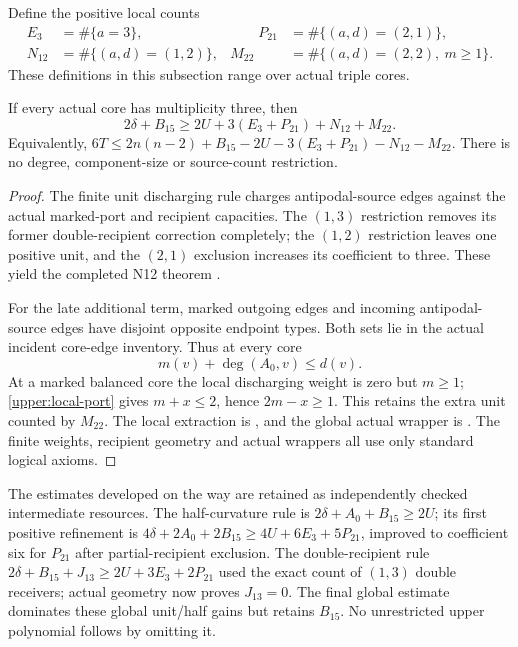 Define the positive local counts
\[
 \begin{aligned}
 E_3&=\#\{a=3\},&\qquad P_{21}&=\#\{(a,d)=(2,1)\},\\
 N_{12}&=\#\{(a,d)=(1,2)\},& M_{22}&=\#\{(a,d)=(2,2),\ m\ge1\}.
 \end{aligned}
\]
These definitions in this subsection range over actual triple cores.
\begin{theorem}
\label{upper:final-m22}
If every actual core has multiplicity three, then
\begin{equation}
 2\delta+B_{15}\ge2U+3(E_3+P_{21})+N_{12}+M_{22}.
 \label{upper:m22-global}
\end{equation}
Equivalently,
$6T\le2n(n-2)+B_{15}-2U-3(E_3+P_{21})-N_{12}-M_{22}$.
There is no degree, component-size or source-count restriction.
\end{theorem}
\begin{proof}
The finite unit discharging rule charges antipodal-source edges against
the actual marked-port and recipient capacities. The $(1,3)$ restriction
removes its former double-recipient correction completely; the $(1,2)$
restriction leaves one positive unit, and the $(2,1)$ exclusion increases
its coefficient to three. These yield the completed N12 theorem
.

For the late additional term, marked outgoing edges and incoming
antipodal-source edges have disjoint opposite endpoint types. Both sets
lie in the actual incident core-edge inventory. Thus at every core
\begin{equation}
 m(v)+\deg(A_0,v)\le d(v).
 \label{upper:local-port}
\end{equation}
At a marked balanced core the local discharging weight is zero but
$m\ge1$; \eqref{upper:local-port} gives $m+x\le2$, hence $2m-x\ge1$.
This retains the extra unit counted by $M_{22}$. The local extraction is
,
and the global actual wrapper is
.
The finite weights, recipient geometry and actual wrappers all use only
standard logical axioms.
\end{proof}

The estimates developed on the way are retained as independently checked
intermediate resources. The half-curvature rule is
$2\delta+A_0+B_{15}\ge2U$; its first positive refinement is
$4\delta+2A_0+2B_{15}\ge4U+6E_3+5P_{21}$, improved to coefficient six
for $P_{21}$ after partial-recipient exclusion. The double-recipient rule
$2\delta+B_{15}+J_{13}\ge2U+3E_3+2P_{21}$ used the exact count of
$(1,3)$ double receivers; actual geometry now proves $J_{13}=0$.
The final global estimate dominates these global unit/half gains but
retains $B_{15}$. No unrestricted upper polynomial follows by omitting it.

